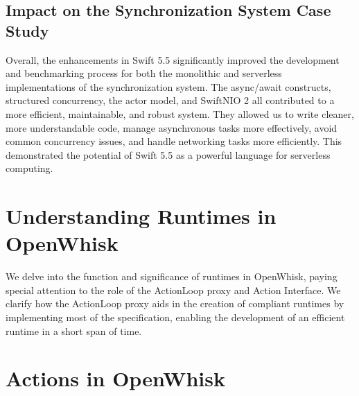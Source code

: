 \subsection{Impact on the Synchronization System Case Study}
\label{subsec:ImpactCaseStudy}

Overall, the enhancements in Swift 5.5 significantly improved the development and benchmarking process for both the monolithic and serverless implementations of the synchronization system. The async/await constructs, structured concurrency, the actor model, and SwiftNIO 2 all contributed to a more efficient, maintainable, and robust system. They allowed us to write cleaner, more understandable code, manage asynchronous tasks more effectively, avoid common concurrency issues, and handle networking tasks more efficiently. This demonstrated the potential of Swift 5.5 as a powerful language for serverless computing.

\section{Understanding Runtimes in OpenWhisk}
\label{sec:OpenWhiskRuntimes}

We delve into the function and significance of runtimes in OpenWhisk, paying special attention to the role of the ActionLoop proxy and Action Interface. We clarify how the ActionLoop proxy aids in the creation of compliant runtimes by implementing most of the specification, enabling the development of an efficient runtime in a short span of time.
\section{Actions in OpenWhisk}

